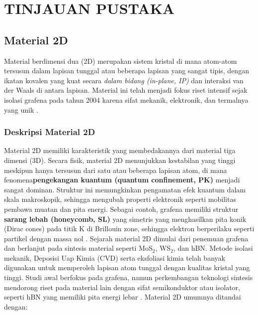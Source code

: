 \renewcommand{\thechapter}{\Roman{chapter}}
\chapter{TINJAUAN PUSTAKA}
\renewcommand{\thechapter}{\arabic{chapter}}


\section{Material 2D}
Material berdimensi dua (2D) merupakan sistem kristal di mana atom-atom tersusun dalam lapisan tunggal atau beberapa lapisan yang sangat tipis, dengan ikatan kovalen yang kuat secara \emph{dalam bidang (in-plane, IP)} dan interaksi van der Waals di antara lapisan. Material ini telah menjadi fokus riset intensif sejak isolasi grafena pada tahun 2004 karena sifat mekanik, elektronik, dan termalnya yang unik \citep{Novoselov2004, Geim2007}. \subsection{Deskripsi Material 2D}
Material 2D memiliki karakteristik yang membedakannya dari material tiga dimensi (3D). Secara fisik, material 2D menunjukkan kestabilan yang tinggi meskipun hanya tersusun dari satu atau beberapa lapisan atom, di mana fenomena\textbf{pengekangan kuantum (quantum confinement, PK)} menjadi sangat dominan. Struktur ini memungkinkan pengamatan efek kuantum dalam skala makroskopik, sehingga mengubah properti elektronik seperti mobilitas pembawa muatan dan pita energi. Sebagai contoh, grafena memiliki struktur \textbf{sarang lebah (honeycomb, SL)} yang simetris yang menghasilkan pita konik (Dirac cones) pada titik K di Brillouin zone, sehingga elektron berperilaku seperti partikel dengan massa nol \citep{CastroNeto2009}. Sejarah material 2D dimulai dari penemuan grafena dan berlanjut pada sintesis material seperti MoS\(_2\), WS\(_2\), dan hBN. Metode isolasi mekanik, Deposisi Uap Kimia (CVD) serta eksfoliasi kimia telah banyak digunakan untuk memperoleh lapisan atom tunggal dengan kualitas kristal yang tinggi. Studi awal berfokus pada grafena, namun perkembangan teknologi sintesis mendorong riset pada material lain dengan sifat semikonduktor atau isolator, seperti hBN yang memiliki pita energi lebar \citep{Geim2013}. Material 2D umumnya ditandai dengan:
